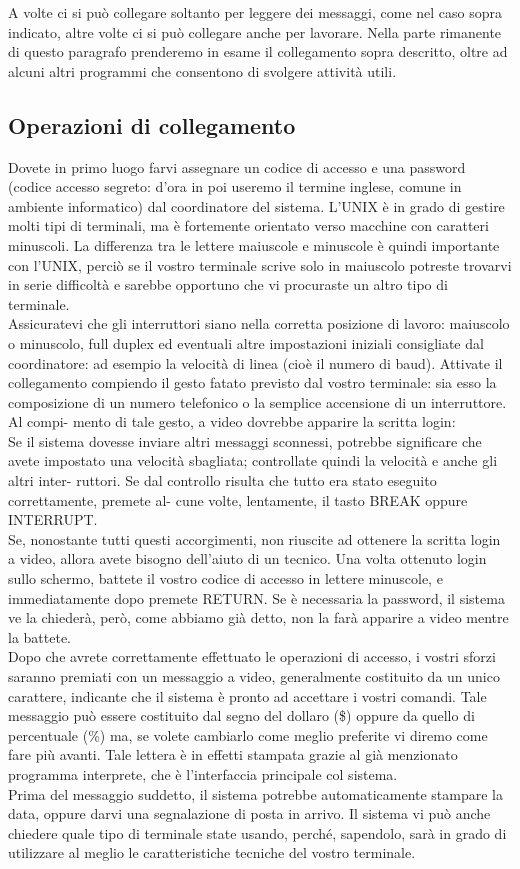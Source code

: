 A volte ci si può collegare soltanto per leggere dei messaggi, come nel caso sopra indicato, altre volte ci si 
può collegare anche per lavorare. Nella parte rimanente di questo paragrafo prenderemo in esame il 
collegamento sopra descritto, oltre ad alcuni altri programmi che consentono di svolgere attività utili.
\subsection{Operazioni di collegamento}
Dovete in primo luogo farvi assegnare un codice di accesso e una password (codice
accesso segreto: d'ora in poi useremo il termine inglese, comune in ambiente informatico)
dal coordinatore del sistema. L'UNIX è in grado di gestire molti tipi di terminali,
ma è fortemente orientato verso macchine con caratteri minuscoli. La differenza
tra le lettere maiuscole e minuscole è quindi importante con l'UNIX, perciò se il
vostro terminale scrive solo in maiuscolo potreste trovarvi in serie difficoltà e sarebbe
opportuno che vi procuraste un altro tipo di terminale.\\
Assicuratevi che gli interruttori siano nella corretta posizione di lavoro: maiuscolo
o minuscolo, full duplex ed eventuali altre impostazioni iniziali consigliate dal coordinatore:
ad esempio la velocità di linea (cioè il numero di baud). Attivate il collegamento
compiendo il gesto fatato previsto dal vostro terminale: sia esso la composizione
di un numero telefonico o la semplice accensione di un interruttore. Al compi-
mento di tale gesto, a video dovrebbe apparire la scritta login:\\
Se il sistema dovesse inviare altri messaggi sconnessi, potrebbe significare che avete
impostato una velocità sbagliata; controllate quindi la velocità e anche gli altri inter-
ruttori. Se dal controllo risulta che tutto era stato eseguito correttamente, premete al-
cune volte, lentamente, il tasto BREAK oppure INTERRUPT.\\
Se, nonostante tutti questi accorgimenti, non riuscite ad ottenere la scritta login a
video, allora avete bisogno dell'aiuto di un tecnico. Una volta ottenuto login sullo
schermo, battete il vostro codice di accesso in lettere minuscole, e immediatamente
dopo premete RETURN. Se è necessaria la password, il sistema ve la chiederà, però,
come abbiamo già detto, non la farà apparire a video mentre la battete.\\
Dopo che avrete correttamente effettuato le operazioni di accesso, i vostri sforzi
saranno premiati con un messaggio a video, generalmente costituito da un unico carattere,
indicante che il sistema è pronto ad accettare i vostri comandi. Tale messaggio 
può essere costituito dal segno del dollaro (\$) oppure da quello di percentuale (\%)
ma, se volete cambiarlo come meglio preferite vi diremo come fare più avanti. Tale
lettera è in effetti stampata grazie al già menzionato programma interprete, che è
l'interfaccia principale col sistema.\\
Prima del messaggio suddetto, il sistema potrebbe automaticamente stampare la
data, oppure darvi una segnalazione di posta in arrivo. Il sistema vi può anche chiedere
quale tipo di terminale state usando, perché, sapendolo, sarà in grado di utilizzare
al meglio le caratteristiche tecniche del vostro terminale.
